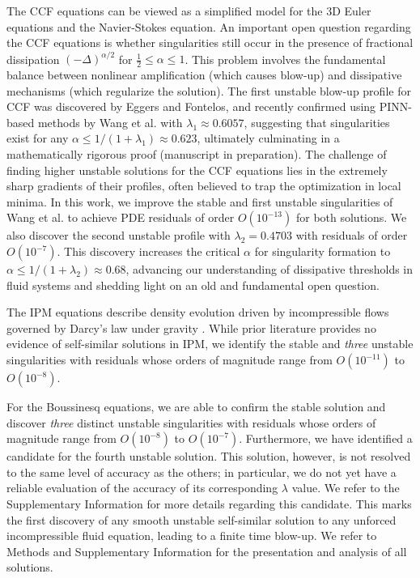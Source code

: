 \documentclass[fleqn,11pt]{wlscirep}
\begin{document}
The CCF equations can be viewed as a simplified model for the 3D Euler equations and the Navier-Stokes equation. An important open question\cite{Silvestre-Vicol:transport-equation-nonlocal-drift}\cite[Open Problem 1]{Kiselev:regularity-blowup-active-scalars} regarding the CCF equations is whether singularities still occur in the presence of fractional dissipation $(-\Delta)^{\alpha/2}$ for $\frac12 \leq \alpha \leq 1$. This problem involves the fundamental balance between nonlinear amplification (which causes blow-up) and dissipative mechanisms (which regularize the solution). The first unstable blow-up profile for CCF was discovered by Eggers and Fontelos\cite{eggers_2020}, and recently confirmed using PINN-based methods by Wang et al. \cite{Wang-Lai-GomezSerrano-Buckmaster:pinn-selfsimilar-boussinesq} with $\lambda_1 \approx 0.6057$, suggesting that singularities exist for any $\alpha \leq 1/(1+\lambda_1) \approx 0.623$, ultimately culminating in a mathematically rigorous proof (manuscript in preparation). The challenge of finding higher unstable solutions for the CCF equations lies in the extremely sharp gradients of their profiles, often believed to trap the optimization in local minima. In this work, we improve the stable and first unstable singularities of Wang et al.\cite{Wang-Lai-GomezSerrano-Buckmaster:pinn-selfsimilar-boussinesq} to achieve PDE residuals of order $O(10^{-13})$ for both solutions. We also discover the second unstable profile with $\lambda_2 = 0.4703$ with residuals of order $O(10^{-7})$. This discovery increases the critical $\alpha$ for singularity formation to $\alpha \leq 1/(1+\lambda_2) \approx 0.68$, advancing our understanding of dissipative thresholds in fluid systems and shedding light on an old and fundamental open question. 

The IPM equations describe density evolution driven by incompressible flows governed by Darcy’s law under gravity \cite{Bear:dynamics-porous-media}. While prior literature provides no evidence of self-similar solutions in IPM\cite{cordobagancedooriveipm2007,cordobazoroaipm},
we identify the stable and  \textit{three} unstable singularities with residuals whose orders of magnitude range from $O(10^{-11})$ to $O(10^{-8})$.

For the Boussinesq equations, we are able to confirm the stable solution and discover \textit{three} distinct unstable singularities with residuals whose orders of magnitude range from $O(10^{-8})$ to $O(10^{-7})$. Furthermore, we have identified a candidate for the fourth unstable solution. This solution, however, is not resolved to the same level of accuracy as the others; in particular, we do not yet have a reliable evaluation of the accuracy of its corresponding $\lambda$ value. We refer to the Supplementary Information for more details regarding this candidate. This marks the first discovery of any smooth unstable self-similar solution to any unforced incompressible fluid equation, leading to a finite time blow-up. We refer to Methods and Supplementary Information for the presentation and analysis of all solutions.
\end{document}
